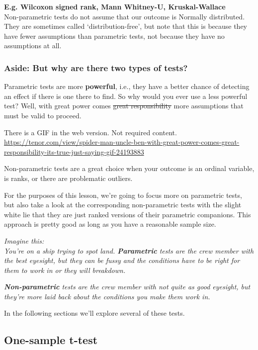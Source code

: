 \documentclass[
]{book}
\begin{document}
\textbf{E.g. Wilcoxon signed rank, Mann Whitney-U, Kruskal-Wallace}\\
Non-parametric tests do not assume that our outcome is Normally distributed. They are sometimes called `distribution-free', but note that this is because they have fewer assumptions than parametric tests, not because they have no assumptions at all.

\hypertarget{aside-but-why-are-there-two-types-of-tests}{%
\subsubsection{Aside: But why are there two types of tests?}\label{aside-but-why-are-there-two-types-of-tests}}

Parametric tests are more \textbf{powerful}, i.e., they have a better chance of detecting an effect if there is one there to find. So why would you ever use a less powerful test? Well, with great power comes \sout{great responsibility} more assumptions that must be valid to proceed.

There is a GIF in the web version. Not required content. \url{https://tenor.com/view/spider-man-uncle-ben-with-great-power-comes-great-responsibility-its-true-just-saying-gif-24193883}

Non-parametric tests are a great choice when your outcome is an ordinal variable, is ranks, or there are problematic outliers.

For the purposes of this lesson, we're going to focus more on parametric tests, but also take a look at the corresponding non-parametric tests with the slight white lie that they are just ranked versions of their parametric companions. This approach is pretty good as long as you have a reasonable sample size.

\emph{Imagine this:}\\
\emph{You're on a ship trying to spot land. \textbf{Parametric} tests are the crew member with the best eyesight, but they can be fussy and the conditions have to be right for them to work in or they will breakdown.}

\emph{\textbf{Non-parametric} tests are the crew member with not quite as good eyesight, but they're more laid back about the conditions you make them work in.}

In the following sections we'll explore several of these tests.

\hypertarget{one-sample-t-test}{%
\subsection{One-sample t-test}\label{one-sample-t-test}}
\end{document}
